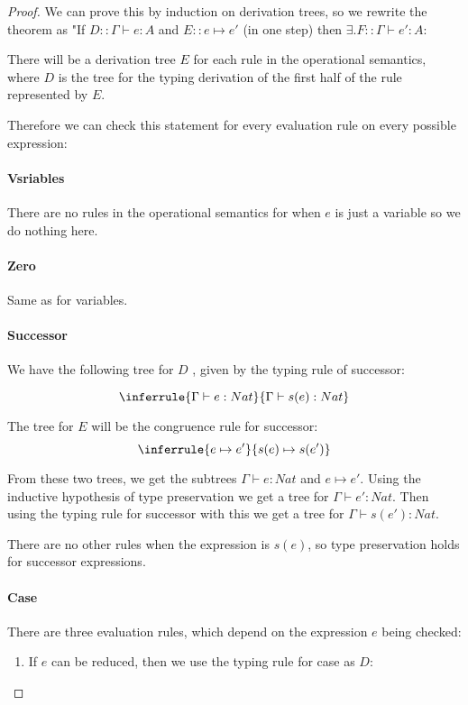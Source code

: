 \begin{proof}
We can prove this by induction on derivation trees, so we rewrite the theorem as "If $D :: \Gamma \vdash e:A$ and $E ::e \mapsto e'$ (in one step) then $\exists. F :: \Gamma \vdash e' : A$:

There will be a derivation tree $E$ for each rule in the operational semantics, where $D$ is the tree for the typing derivation of the first half of the rule represented by $E$.

Therefore we can check this statement for every evaluation rule on every possible expression:

\paragraph{Vsriables} There are no rules in the operational semantics for when $e$ is just a variable so we do nothing here.

\paragraph{Zero} Same as for variables.

\paragraph{Successor} We have the following tree for $D$ , given by the typing rule of successor:

$$
\inferrule { \Gamma \vdash e : Nat }
 {\Gamma \vdash s(e) : Nat}
$$

The tree for $E$ will be the congruence rule for successor:
$$
\inferrule { e \mapsto e'} {s(e) \mapsto s(e')}
$$

From these two trees, we get the subtrees $\Gamma \vdash e : Nat$ and $e \mapsto e'$. Using the inductive  hypothesis of type preservation we get a tree for $\Gamma \vdash e' : Nat$. Then using the typing rule for successor with this we get a tree for $\Gamma \vdash s(e') : Nat$. 

There are no other rules when the expression is $s(e)$, so type preservation holds for successor expressions.  

\paragraph{Case} There are three evaluation rules, which depend on the expression $e$ being checked:

\begin{enumerate}
\item{If $e$ can be reduced, then we use the typing rule for case as $D$:

}
\end{enumerate}
\end{proof}

